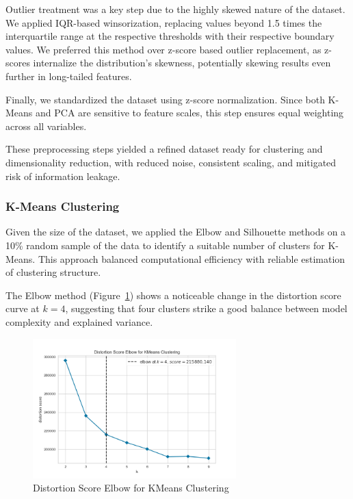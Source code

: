 \documentclass{article}
\begin{document}
Outlier treatment was a key step due to the highly skewed nature of the dataset. We applied IQR-based winsorization, replacing values beyond 1.5 times the interquartile range at the respective thresholds with their respective boundary values. We preferred this method over z-score based outlier replacement, as z-scores internalize the distribution’s skewness, potentially skewing results even further in long-tailed features.

Finally, we standardized the dataset using z-score normalization. Since both K-Means and PCA are sensitive to feature scales, this step ensures equal weighting across all variables.

These preprocessing steps yielded a refined dataset ready for clustering and dimensionality reduction, with reduced noise, consistent scaling, and mitigated risk of information leakage.

\subsubsection{K-Means Clustering}

Given the size of the dataset, we applied the Elbow and Silhouette methods on a 10\% random sample of the data to identify a suitable number of clusters for K-Means. This approach balanced computational efficiency with reliable estimation of clustering structure.

The Elbow method (Figure~\ref{fig:elbow}) shows a noticeable change in the distortion score curve at $k=4$, suggesting that four clusters strike a good balance between model complexity and explained variance.

\begin{figure}[H]
    \centering
    \includegraphics[width=0.7\textwidth]{figures/elbow_plot.png}
    \caption{Distortion Score Elbow for KMeans Clustering}
    \label{fig:elbow}
\end{figure}
\end{document}
